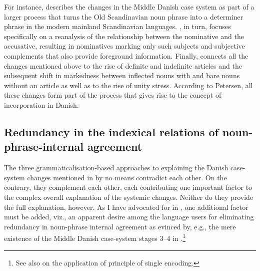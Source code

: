 \documentclass[output=paper]{langsci/langscibook}
\begin{document}
For instance, \citet[13--22]{Heltoft2010} describes the changes in the Middle Danish case system as part of a larger process that turns the Old Scandinavian noun phrase into a determiner phrase in the modern mainland Scandinavian languages. \citet[201–232, 283–311]{Jensen2011}, in turn, focuses specifically on a reanalysis of the relationship between the nominative and the accusative, resulting in nominatives marking only such subjects and subjective complements that also provide foreground information. Finally, \citet[e.g. 63–89]{Petersen2018} connects all the changes mentioned above to the rise of definite and indefinite articles and the subsequent shift in markedness between inflected nouns with and bare nouns without an article as well as to the rise of unity stress. According to Petersen, all these changes form part of the process that gives rise to the concept of incorporation in Danish.

\subsection{Redundancy in the indexical relations of noun-phrase-internal agreement} \label{hansen:3.4}

The three grammaticalisation-based approaches to explaining the Danish case-system changes mentioned in  by no means contradict each other. On the contrary, they complement each other, each contributing one important factor to the complex overall explanation of the systemic changes. Neither do they provide the full explanation, however. As I have advocated for in \citet{Hansen2021}, one additional factor must be added, viz., an apparent desire among the language users for eliminating redundancy in noun-phrase internal agreement as evinced by, e.g., the mere existence of the Middle Danish case-system stages 3–4 in .\footnote{See also  on the application of  principle of single encoding.}
\end{document}
